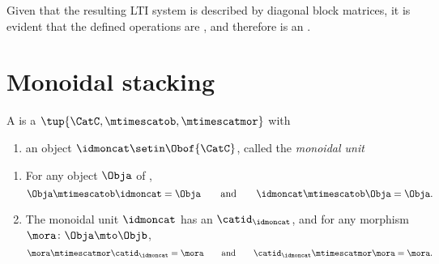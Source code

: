 Given that the resulting LTI system is described by diagonal block matrices, it is evident that the defined operations are , and therefore \LTI is an  .

\section{Monoidal stacking}\label{sec:moinoidal-stacking}

\begin{ctdefinition}
    \label{def:strict-monoidal-stacking-semicat}
    A  is a  $\tup{\CatC, \mtimescatob, \mtimescatmor}$ with

    \constit

    \begin{enumerate}
        \item an object $\idmoncat \setin \Obof{\CatC}$, called the \emph{monoidal unit}
    \end{enumerate}

    \condit

    \begin{enumerate}
        \item For any object $\Obja$ of \CatC,
              \begin{equation}\label{eq:strict-mon-stacking-semicat-cond1}
                  \Obja \mtimescatob \idmoncat = \Obja \qquad \text{and} \qquad \idmoncat \mtimescatob \Obja = \Obja.
              \end{equation}
        \item The monoidal unit $\idmoncat$ has an  $\catid_\idmoncat$, and for any morphism $\mora \colon \Obja \mto \Objb$,
              \begin{equation}\label{eq:strict-mon-stacking-semicat-cond2}
                  \mora \mtimescatmor \catid_\idmoncat = \mora \qquad \text{and} \qquad \catid_\idmoncat \mtimescatmor  \mora = \mora.
              \end{equation}
    \end{enumerate}
\end{ctdefinition}

